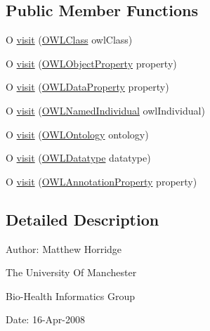 \subsection*{Public Member Functions}
\begin{DoxyCompactItemize}
\item 
O \hyperlink{interfaceorg_1_1semanticweb_1_1owlapi_1_1model_1_1_o_w_l_named_object_visitor_ex_3_01_o_01_4_a71ef706980683f77831e5d61fcdeca9e}{visit} (\hyperlink{interfaceorg_1_1semanticweb_1_1owlapi_1_1model_1_1_o_w_l_class}{O\-W\-L\-Class} owl\-Class)
\item 
O \hyperlink{interfaceorg_1_1semanticweb_1_1owlapi_1_1model_1_1_o_w_l_named_object_visitor_ex_3_01_o_01_4_ae5260a639561703f93f439a008488515}{visit} (\hyperlink{interfaceorg_1_1semanticweb_1_1owlapi_1_1model_1_1_o_w_l_object_property}{O\-W\-L\-Object\-Property} property)
\item 
O \hyperlink{interfaceorg_1_1semanticweb_1_1owlapi_1_1model_1_1_o_w_l_named_object_visitor_ex_3_01_o_01_4_aebc691ada859a2a96e9c3ca19e70abc1}{visit} (\hyperlink{interfaceorg_1_1semanticweb_1_1owlapi_1_1model_1_1_o_w_l_data_property}{O\-W\-L\-Data\-Property} property)
\item 
O \hyperlink{interfaceorg_1_1semanticweb_1_1owlapi_1_1model_1_1_o_w_l_named_object_visitor_ex_3_01_o_01_4_a3443ca6969dc2e9e77ec43d1dffca5ce}{visit} (\hyperlink{interfaceorg_1_1semanticweb_1_1owlapi_1_1model_1_1_o_w_l_named_individual}{O\-W\-L\-Named\-Individual} owl\-Individual)
\item 
O \hyperlink{interfaceorg_1_1semanticweb_1_1owlapi_1_1model_1_1_o_w_l_named_object_visitor_ex_3_01_o_01_4_a140ad6df3ae992b1ecb9c36f17d6c310}{visit} (\hyperlink{interfaceorg_1_1semanticweb_1_1owlapi_1_1model_1_1_o_w_l_ontology}{O\-W\-L\-Ontology} ontology)
\item 
O \hyperlink{interfaceorg_1_1semanticweb_1_1owlapi_1_1model_1_1_o_w_l_named_object_visitor_ex_3_01_o_01_4_aa0746b4bbcbb5920518d00ea14e1b978}{visit} (\hyperlink{interfaceorg_1_1semanticweb_1_1owlapi_1_1model_1_1_o_w_l_datatype}{O\-W\-L\-Datatype} datatype)
\item 
O \hyperlink{interfaceorg_1_1semanticweb_1_1owlapi_1_1model_1_1_o_w_l_named_object_visitor_ex_3_01_o_01_4_a24b91a58aad3b767b33bde7de863178f}{visit} (\hyperlink{interfaceorg_1_1semanticweb_1_1owlapi_1_1model_1_1_o_w_l_annotation_property}{O\-W\-L\-Annotation\-Property} property)
\end{DoxyCompactItemize}


\subsection{Detailed Description}
Author\-: Matthew Horridge\par
 The University Of Manchester\par
 Bio-\/\-Health Informatics Group\par
 Date\-: 16-\/\-Apr-\/2008\par
\par
 

